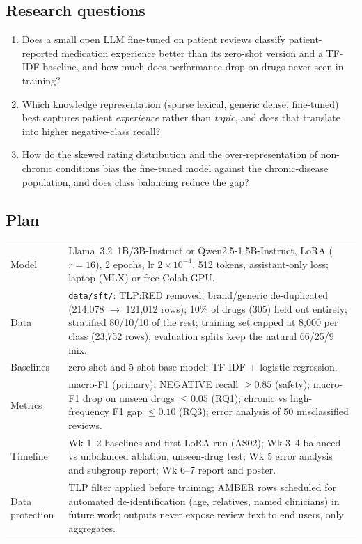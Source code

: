 \documentclass[11pt]{article}
\newcommand{\code}[1]{\texttt{#1}}
\begin{document}
\subsection{Research questions}
\begin{enumerate}
\item[\textbf{RQ1}] Does a small open LLM fine-tuned on patient reviews classify patient-reported medication experience better than its zero-shot version and a TF-IDF baseline, and how much does performance drop on drugs never seen in training?
\item[\textbf{RQ2}] Which knowledge representation (sparse lexical, generic dense, fine-tuned) best captures patient \emph{experience} rather than \emph{topic}, and does that translate into higher negative-class recall?
\item[\textbf{RQ3}] How do the skewed rating distribution and the over-representation of non-chronic conditions bias the fine-tuned model against the chronic-disease population, and does class balancing reduce the gap?
\end{enumerate}

\subsection{Plan}
\begin{table}[H]\centering\small
\begin{tabular}{p{2.8cm}p{12.2cm}}\toprule
Model & Llama~3.2~1B/3B-Instruct or Qwen2.5-1.5B-Instruct, LoRA ($r=16$), 2 epochs, lr $2\times10^{-4}$, 512 tokens, assistant-only loss; laptop (MLX) or free Colab GPU. \\
Data & \code{data/sft/}: TLP:RED removed; brand/generic de-duplicated (214,078 $\to$ 121,012 rows); 10\% of drugs (305) held out entirely; stratified 80/10/10 of the rest; training set capped at 8,000 per class (23,752 rows), evaluation splits keep the natural 66/25/9 mix. \\
Baselines & zero-shot and 5-shot base model; TF-IDF + logistic regression. \\
Metrics & macro-F1 (primary); NEGATIVE recall $\ge 0.85$ (safety); macro-F1 drop on unseen drugs $\le 0.05$ (RQ1); chronic vs high-frequency F1 gap $\le 0.10$ (RQ3); error analysis of 50 misclassified reviews. \\
Timeline & Wk 1--2 baselines and first LoRA run (AS02); Wk 3--4 balanced vs unbalanced ablation, unseen-drug test; Wk 5 error analysis and subgroup report; Wk 6--7 report and poster. \\
Data protection & TLP filter applied before training; AMBER rows scheduled for automated de-identification (age, relatives, named clinicians) in future work; outputs never expose review text to end users, only aggregates. \\
\bottomrule\end{tabular}
\end{table}
\end{document}
